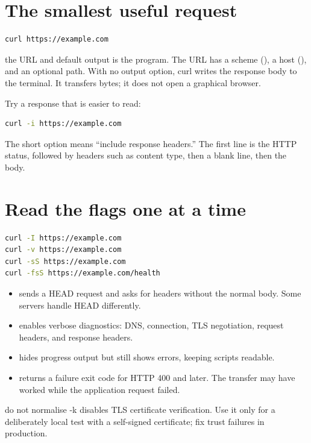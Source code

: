 \documentclass[11pt,a4paper,openany]{book}
\newcommand{\command}[1]{\texttt{\small\detokenize{#1}}}
\begin{document}
\section{The smallest useful request}
\begin{lstlisting}[language=bash]
curl https://example.com
\end{lstlisting}
\begin{explainbox}{the URL and default output}
\command{curl} is the program. The URL has a scheme (\command{https}), a host (\command{example.com}), and an optional path. With no output option, curl writes the response body to the terminal. It transfers bytes; it does not open a graphical browser.
\end{explainbox}
Try a response that is easier to read:
\begin{lstlisting}[language=bash]
curl -i https://example.com
\end{lstlisting}
The short option \command{-i} means ``include response headers.'' The first line is the HTTP status, followed by headers such as content type, then a blank line, then the body.
\section{Read the flags one at a time}
\begin{lstlisting}[language=bash]
curl -I https://example.com
curl -v https://example.com
curl -sS https://example.com
curl -fsS https://example.com/health
\end{lstlisting}
\begin{itemize}
\item \command{-I} sends a HEAD request and asks for headers without the normal body. Some servers handle HEAD differently.
\item \command{-v} enables verbose diagnostics: DNS, connection, TLS negotiation, request headers, and response headers.
\item \command{-sS} hides progress output but still shows errors, keeping scripts readable.
\item \command{-f} returns a failure exit code for HTTP 400 and later. The transfer may have worked while the application request failed.
\end{itemize}
\begin{safetybox}{do not normalise -k}
\command{-k} disables TLS certificate verification. Use it only for a deliberately local test with a self-signed certificate; fix trust failures in production.
\end{safetybox}
\end{document}

